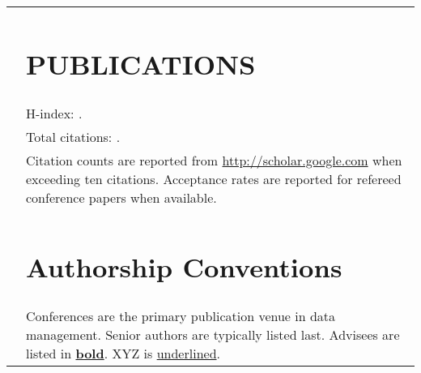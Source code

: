 \documentclass[10pt, line]{res}
\begin{document}
\begin{resume}
\begin{longtable}{L R}
 
\end{longtable}

\clearpage
\begin{longtable}{L R}

\end{longtable}

\clearpage
\begin{longtable}{rp{5.5in}} 
    &\section{PUBLICATIONS}\\
    &H-index: .\\
    &Total citations: .\\
    &Citation counts are reported from {\url{http://scholar.google.com}} when exceeding ten citations.  Acceptance rates are reported for refereed conference papers when available.\\
  
    &\section{Authorship Conventions}\\
    &Conferences are the primary publication venue in data management.   Senior authors are typically listed last.  Advisees are listed in \underline{\bf bold}.  XYZ is \underline{underlined}.  \\


\end{longtable}


\clearpage
\begin{longtable}{L R}

\end{longtable}

\clearpage

\begin{longtable}{L R}

\end{longtable}


\end{resume}
\end{document}
